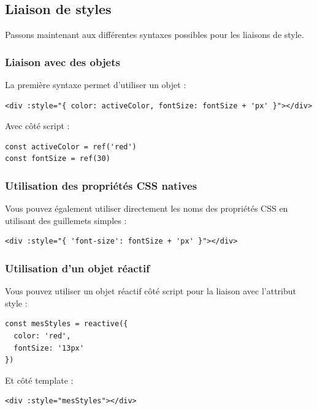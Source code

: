\documentclass{article}
\begin{document}
\subsection{Liaison de styles}
Passons maintenant aux différentes syntaxes possibles pour les liaisons de style.

\subsubsection{Liaison avec des objets}
La première syntaxe permet d'utiliser un objet :
\begin{verbatim}
<div :style="{ color: activeColor, fontSize: fontSize + 'px' }"></div>
\end{verbatim}

Avec côté {\color{monOrange}script} :
\begin{verbatim}
const activeColor = ref('red')
const fontSize = ref(30)
\end{verbatim}

\subsubsection{Utilisation des propriétés CSS natives}
Vous pouvez également utiliser directement les noms des propriétés CSS en utilisant des guillemets simples :
\begin{verbatim}
<div :style="{ 'font-size': fontSize + 'px' }"></div>
\end{verbatim}

\subsubsection{Utilisation d'un objet réactif}
Vous pouvez utiliser un objet réactif côté script pour la liaison avec l'attribut {\color{monOrange}style} :
\begin{verbatim}
const mesStyles = reactive({
  color: 'red',
  fontSize: '13px'
})
\end{verbatim}
Et côté {\color{monOrange}template} :
\begin{verbatim}
<div :style="mesStyles"></div>
\end{verbatim}
\end{document}
